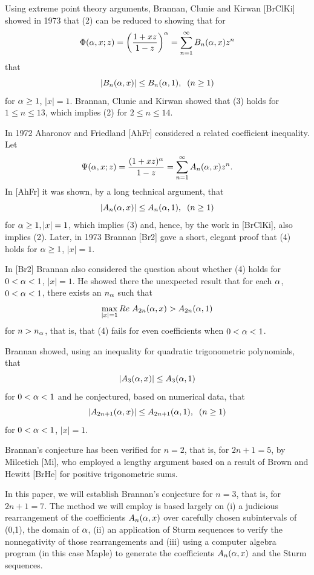 Using extreme point theory arguments, Brannan, Clunie and Kirwan
[BrClKi] showed in 1973 that (2) can be reduced to showing that for
$$
\Phi(\alpha,x;z)=\left(\frac{1+xz}{1-z}\right)^\alpha=
\sum^\infty_{n=1}B_n(\alpha,x)z^n
$$
that
\begin{equation}
\label{3}
|B_n(\alpha,x)|\leq B_n(\alpha,1),\;\; (n\geq 1)
\end{equation}
for $\alpha\geq 1$, $|x|=1$.  Brannan, Clunie and Kirwan showed that (3)
holds for $1\leq n\leq 13$, which implies (2) for $2\leq n\leq 14$.

In 1972 Aharonov and Friedland [AhFr] considered a related
coefficient inequality.  Let
$$
\Psi(\alpha,x;z)=\frac{(1+xz)^\alpha}{1-z}=\sum^\infty_{n=1}A_n(\alpha,x)z^n.
$$
In [AhFr] it was shown, by a long technical argument, that
\begin{equation}
\label{4}
|A_n(\alpha,x)|\leq A_n(\alpha,1),\;\; (n\geq 1)
\end{equation}
for $\alpha\geq 1,|x|=1$, which implies (3) and, hence, by the work in
[BrClKi], also implies (2).  Later, in 1973 Brannan [Br2] gave a
short, elegant proof that (4) holds for $\alpha\geq 1$, $|x|=1$.

In [Br2] Brannan also considered the question about whether (4) holds
for $0<\alpha<1$, $|x|=1$.  He showed there the unexpected result that
for each $\alpha$, $0<\alpha<1$, there exists an $n_\alpha$ such that
\begin{equation}
\label{5}
\max_{|x|=1}{Re}\; A_{2n}(\alpha,x)>A_{2n}(\alpha,1)
\end{equation}
for $n>n_\alpha$, that is, that (4) fails for even coefficients when
$0<\alpha<1$.

Brannan showed, using an inequality for quadratic trigonometric
polynomials, that
$$
|A_3(\alpha,x)|\leq A_3(\alpha,1)
$$
for $0<\alpha<1$ and he conjectured, based on numerical data, that\\

\begin{equation}
\label{6}
|A_{2n+1}(\alpha,x)|\leq A_{2n+1}(\alpha,1),\;\; (n\geq 1)
\end{equation}
for $0<\alpha<1$, $|x|=1$.

Brannan's conjecture has been verified for $n=2$, that is, for
$2n+1=5$, by Milcetich [Mi], who employed a lengthy argument based
on a result of Brown and Hewitt [BrHe] for positive trigonometric
sums.

In this paper, we will establish Brannan's conjecture for $n=3$, that
is, for $2n+1=7$.  The method we will employ is based largely on (i)
a judicious rearrangement of the coefficients $A_n(\alpha,x)$ over
carefully chosen subintervals of (0,1), the domain of $\alpha$, (ii) an
application of Sturm sequences to verify the nonnegativity of those
rearrangements and (iii) using a computer algebra program (in this
case Maple) to generate the coefficients $A_n(\alpha,x)$ and the Sturm
sequences.\\

